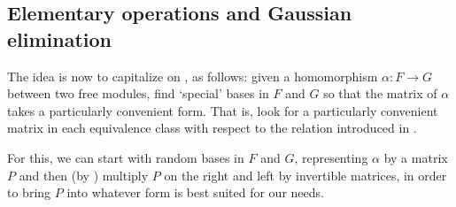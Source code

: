 \subsection{Elementary operations and Gaussian elimination}
\label{subsec:linalg:elementary-operations-and-gaussian-elimination}
The idea is now to capitalize on , as follows: given
a homomorphism $\alpha : F \to G$ between two free modules, find
`special' bases in $F$ and $G$ so that the matrix of $\alpha$ takes a
particularly convenient form. That is, look for a particularly
convenient matrix in each equivalence class with respect to the
relation introduced in .

For this, we can start with random bases in $F$ and $G$, representing
$\alpha$ by a matrix $P$ and then (by ) multiply $P$
on the right and left by invertible matrices, in order to bring $P$
into whatever form is best suited for our needs.

